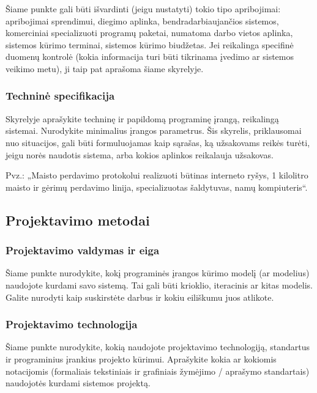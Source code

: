 \documentclass{ktuthesis}
\begin{document}
  Šiame punkte gali būti išvardinti (jeigu nustatyti) tokio tipo apribojimai: apribojimai sprendimui, diegimo aplinka, bendradarbiaujančios sistemos, komerciniai
  specializuoti programų paketai, numatoma darbo vietos aplinka, sistemos kūrimo terminai, sistemos kūrimo biudžetas. Jei reikalinga specifinė duomenų kontrolė
  (kokia informacija turi būti tikrinama įvedimo ar sistemos veikimo metu), ji taip pat aprašoma šiame skyrelyje.

  \subsubsection{Techninė specifikacija}

  Skyrelyje aprašykite techninę ir papildomą programinę įrangą, reikalingą sistemai. Nurodykite minimalius įrangos parametrus. Šis skyrelis, priklausomai nuo
  situacijos, gali būti formuluojamas kaip sąrašas, ką užsakovams reikės turėti, jeigu norės naudotis sistema, arba kokios aplinkos reikalauja užsakovas.

  Pvz.: „Maisto perdavimo protokolui realizuoti būtinas interneto ryšys, 1 kilolitro maisto ir gėrimų perdavimo linija, specializuotas šaldytuvas, namų kompiuteris“.

  \subsection{Projektavimo metodai}

  \subsubsection{Projektavimo valdymas ir eiga}

  Šiame punkte nurodykite, kokį programinės įrangos kūrimo modelį (ar modelius) naudojote kurdami savo sistemą. Tai gali būti krioklio, iteracinis ar kitas modelis.
  Galite nurodyti kaip suskirstėte darbus ir kokiu eiliškumu juos atlikote.

  \subsubsection{Projektavimo technologija}

  Šiame punkte nurodykite, kokią naudojote projektavimo technologiją, standartus ir programinius įrankius projekto kūrimui. Aprašykite kokia ar kokiomis notacijomis
  (formaliais tekstiniais ir grafiniais žymėjimo / aprašymo standartais) naudojotės kurdami sistemos projektą.
\end{document}
